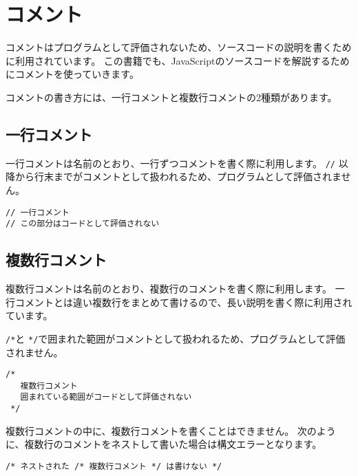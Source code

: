 \hypertarget{comment}{%
\chapter{コメント}\label{comment}}
\thispagestyle{frontheadings}

コメントはプログラムとして評価されないため、ソースコードの説明を書くために利用されています。
この書籍でも、JavaScriptのソースコードを解説するためにコメントを使っていきます。

コメントの書き方には、一行コメントと複数行コメントの2種類があります。

\hypertarget{single-line-comment}{%
\section{一行コメント}\label{single-line-comment}}

一行コメントは名前のとおり、一行ずつコメントを書く際に利用します。
\texttt{//}
以降から行末までがコメントとして扱われるため、プログラムとして評価されません。

\begin{lstlisting}
// 一行コメント
// この部分はコードとして評価されない
\end{lstlisting}

\hypertarget{multi-line-comment}{%
\section{複数行コメント}\label{multi-line-comment}}

複数行コメントは名前のとおり、複数行のコメントを書く際に利用します。
一行コメントとは違い複数行をまとめて書けるので、長い説明を書く際に利用されています。

\texttt{/*}と
\texttt{*/}で囲まれた範囲がコメントとして扱われるため、プログラムとして評価されません。

\begin{lstlisting}
/* 
   複数行コメント
   囲まれている範囲がコードとして評価されない
 */
\end{lstlisting}

複数行コメントの中に、複数行コメントを書くことはできません。
次のように、複数行のコメントをネストして書いた場合は構文エラーとなります。

\begin{lstlisting}
/* ネストされた /* 複数行コメント */ は書けない */
\end{lstlisting}

